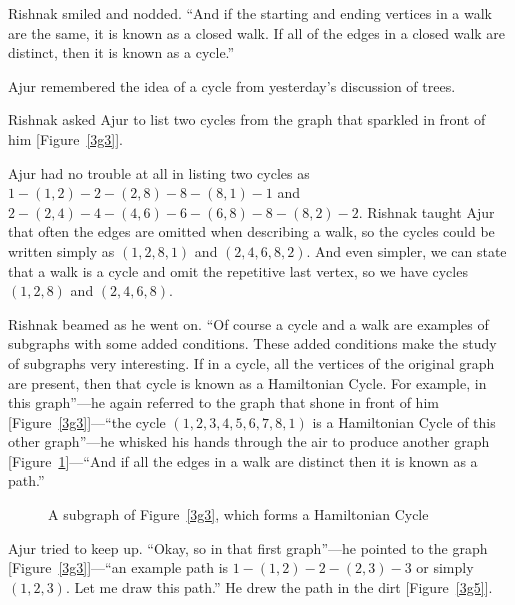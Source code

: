 Rishnak smiled and nodded. ``And if the starting and ending vertices in a walk are the same, it is known as a closed walk. If all of the edges in a closed walk are distinct, then it is known as a cycle.''

Ajur remembered the idea of a cycle from yesterday's discussion of trees.

Rishnak asked Ajur to list two cycles from the graph that sparkled in front of him [Figure~\ref{3g3}].

Ajur had no trouble at all in listing two cycles as $1-(1,2)-2-(2,8)-8-(8,1)-1$ and $2-(2,4)-4-(4,6)-6-(6,8)-8-(8,2)-2$. Rishnak taught Ajur that often the edges are omitted when describing a walk, so the cycles could be written simply as $(1,2,8,1)$ and $(2,4,6,8,2)$. And even simpler, we can state that a walk is a cycle and omit the repetitive last vertex, so we have cycles $(1,2,8)$ and $(2,4,6,8)$.

Rishnak beamed as he went on.  ``Of course a cycle and a walk are examples of subgraphs with some added conditions. These added conditions make the study of subgraphs very interesting. If in a cycle, all the vertices of the original graph are present, then that cycle is known as a Hamiltonian Cycle. For example, in this graph''---he again referred to the graph that shone in front of him [Figure~\ref{3g3}]---``the cycle $(1,2,3,4,5,6,7,8,1)$ is a Hamiltonian Cycle of this other graph''---he whisked his hands through the air to produce another graph [Figure~\ref{3g4}]---``And if all the edges in a walk are distinct then it is known as a path.''

\begin{figure}
\begin{center}
\caption{A subgraph of Figure~\ref{3g3}, which forms a Hamiltonian Cycle}\label{3g4}
\end{center}
\end{figure}


Ajur tried to keep up.  ``Okay, so in that first graph''---he pointed to the graph [Figure~\ref{3g3}]---``an example path is $1-(1,2)-2-(2,3)-3$ or simply $(1,2,3)$. Let me draw this path.'' He drew the path in the dirt [Figure~\ref{3g5}].

